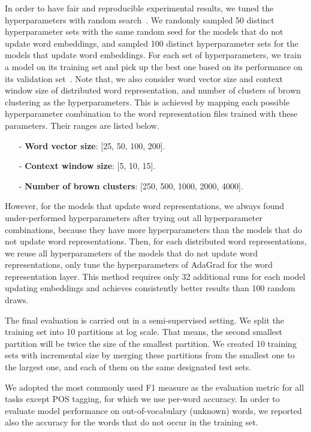 In order to have fair and reproducible experimental results, we tuned the hyperparameters with random search~\cite{bergstra2012random}. 
We randomly sampled 50 distinct hyperparameter sets with the same random seed for the models that do not update word embeddings, and sampled 100 distinct hyperparameter sets for the models that update word embeddings. 
For each set of hyperparameters, we train a model on its training set and pick up the best one based on its performance on its validation set~\cite{turian2010word}. 
Note that, we also consider word vector size and context window size of distributed word representation, and number of clusters of brown clustering as the hyperparameters.
This is achieved by mapping each possible hyperparameter combination to the word representation files trained with these parameters. 
Their ranges are listed below.

\begin{small}
\begin{itemize}
\item[-]\textbf{Word vector size}: [25, 50, 100, 200].
\item[-]\textbf{Context window size}: [5, 10, 15].
\item[-]\textbf{Number of brown clusters}: [250, 500, 1000, 2000, 4000]. 
\end{itemize}
\end{small}

However, for the models that update word representations, we always found under-performed hyperparameters after trying out all hyperparameter combinations, because they have more hyperparameters than the models that do not update word representations. Then, for each distributed word representations, we reuse all hyperparameters of the models that do not update word representations, only tune the hyperparameters of AdaGrad for the word representation layer. This method requires only 32 additional runs for each model updating embeddings and achieves consistently better results than 100 random draws.

The final evaluation is carried out in a semi-supervised setting. We split the training set into 10 partitions at log scale. That means, the second smallest partition will be twice the size of the smallest partition. We created 10 training sets with incremental size by merging these partitions from the smallest one to the largest one, and each of them on the same designated test sets. 

We adopted the most commonly used F1 measure as the evaluation metric for all tasks except POS tagging, for which we use per-word accuracy. In order to evaluate model performance on out-of-vocabulary (unknown) words, we reported also the accuracy for the words that do not occur in the training set.

